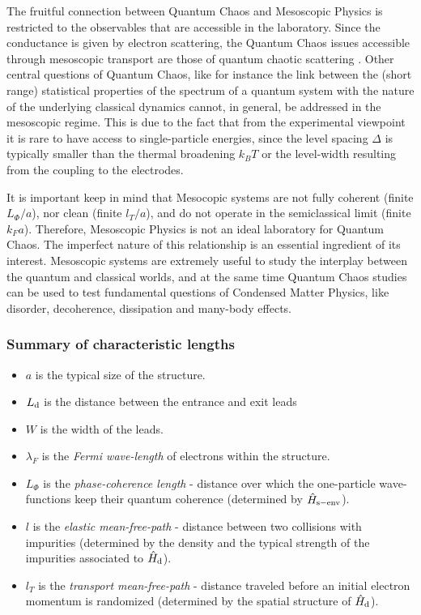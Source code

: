 \documentclass[a4paper,10pt]{article}
\newcommand{\kf}{k_{\scriptscriptstyle F}}
\newcommand{\lf}{\lambda_{\scriptscriptstyle F}}
\newcommand{\lt}{l_{\scriptscriptstyle T}}
\newcommand{\nin}{\noindent}
\begin{document}
The fruitful connection between Quantum Chaos and Mesoscopic Physics is restricted to the observables that are accessible in the laboratory. Since the conductance is given by electron scattering, the Quantum Chaos issues accessible through mesoscopic transport are those of quantum chaotic scattering \cite{Gaspard}. Other central questions of Quantum Chaos, like for instance the link between the (short range) statistical properties of the spectrum of a quantum system with the nature of the underlying classical dynamics \cite{BGS84,Ullm14} cannot, in general, be addressed in the mesoscopic regime. This is due to the fact that from the experimental viewpoint it is rare to have access to single-particle energies, since the level spacing $\Delta$ is typically smaller than the thermal broadening $k_B T$ or the level-width resulting from the coupling to the electrodes. 

\nin It is important keep in mind that Mesocopic systems are not fully coherent (finite $L_{\Phi}/a$), nor clean (finite $\lt/a$), and do not operate in the semiclassical limit (finite $\kf a$). Therefore, Mesoscopic Physics is not an ideal laboratory for Quantum Chaos. The imperfect nature of this relationship is an essential ingredient of its interest. Mesoscopic systems are extremely useful to study the interplay between the quantum and classical worlds, and at the same time Quantum Chaos studies can be used to test fundamental questions of Condensed Matter Physics, like disorder, decoherence, dissipation and many-body effects. 

\subsubsection{Summary of characteristic lengths}

\begin{itemize}

\item $a$ is the typical size of the structure.

\item $L_{\rm d}$ is the distance between the entrance and exit leads

\item $W$ is the width of the leads.

\item $\lf$ is the {\it Fermi wave-length} of electrons within the structure.

\item $L_{\Phi}$ is the {\it phase-coherence length} - distance over which the one-particle wave-functions keep their quantum coherence (determined by $\hat H_{\rm s-env}$).

\item $l$ is the {\it elastic mean-free-path} - distance between two collisions with impurities (determined by the density and the typical strength of the impurities associated to $\hat H_{\rm d}$).

\item $\lt$ is the {\it transport mean-free-path} - distance traveled before an initial electron momentum is randomized (determined by the spatial structure of $\hat H_{\rm d}$).

\end{itemize}
\end{document}
